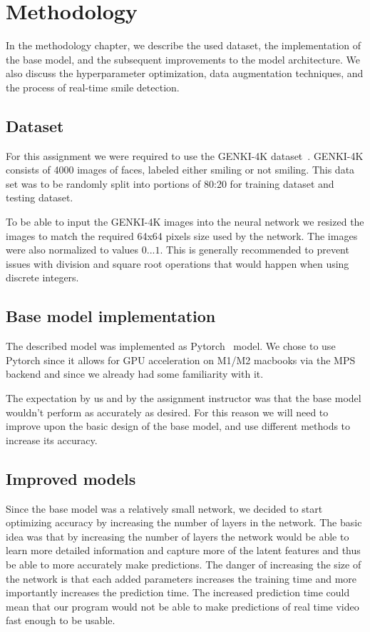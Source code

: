 \documentclass[12pt,a4paper,english
]{tunithesis}
\begin{document}
\chapter{Methodology}
\label{sec:methodology}
In the methodology chapter, we describe the used dataset, the implementation of the base model, and the subsequent improvements to the model architecture. We also discuss the hyperparameter optimization, data augmentation techniques, and the process of real-time smile detection.
\section{Dataset}
For this assignment we were required to use the GENKI-4K dataset~\cite{genki}. GENKI-4K consists of 4000 images of faces, labeled either smiling or not smiling. This data set was to be randomly split into portions of 80:20 for training dataset and testing dataset.

To be able to input the GENKI-4K images into the neural network we resized the images to match the required 64x64 pixels size used by the network. The images were also normalized to values $0...1$. This is generally recommended to prevent issues with division and square root operations that would happen when using discrete integers.


\section{Base model implementation}
The described model was implemented as Pytorch~\cite{pytorch} model. We chose to use Pytorch since it allows for GPU acceleration on M1/M2 macbooks via the MPS backend and since we already had some familiarity with it.

The expectation by us and by the assignment instructor was that the base model wouldn't perform as accurately as desired. For this reason we will need to improve upon the basic design of the base model, and use different methods to increase its accuracy.

\section{Improved models}
Since the base model was a relatively small network, we decided to start optimizing accuracy by increasing the number of layers in the network. The basic idea was that by increasing the number of layers the network would be able to learn more detailed information and capture more of the latent features and thus be able to more accurately make predictions. The danger of increasing the size of the network is that each added parameters increases the training time and more importantly increases the prediction time. The increased prediction time could mean that our program would not be able to make predictions of real time video fast enough to be usable.
\end{document}
